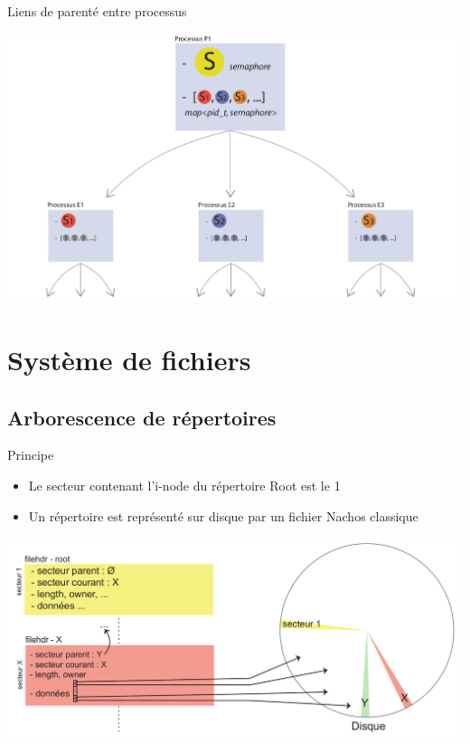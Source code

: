 \documentclass{beamer}
\begin{document}
\begin{frame}{Liens de parenté entre processus}
  	\begin{center}
	  	\includegraphics[scale=0.19]{images/FS6.png}
  	\end{center}
\end{frame}
\section{Système de fichiers}
\subsection{Arborescence de répertoires}
\begin{frame}
  \begin{block}{Principe}
  	\begin{itemize}%
  		\item Le secteur contenant l'i-node du répertoire Root est le 1
  		\item Un répertoire est représenté sur disque par un fichier Nachos classique
  	\end{itemize}  
  \end{block}
  \begin{center}
	  \includegraphics[scale=0.2]{images/FS1.png}
  \end{center}
\end{frame}
\end{document}
